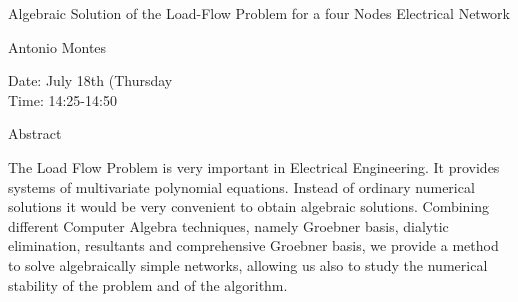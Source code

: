 \begin{center}
\LARGE
Algebraic Solution of the Load-Flow Problem for a four
                   Nodes Electrical Network
\end{center}

\begin{center}
\Large
Antonio Montes
\end{center}

\noindent
Date:  July 18th (Thursday\\
Time:  14:25-14:50\\

\begin{center}
\large
Abstract
\end{center}

The Load Flow Problem is very important in Electrical Engineering. It provides systems of
multivariate polynomial equations. Instead of ordinary numerical solutions it would be very
convenient to obtain algebraic solutions. Combining different Computer Algebra techniques,
namely Groebner basis, dialytic elimination, resultants and comprehensive Groebner basis, we
provide a method to solve algebraically simple networks, allowing us also to study the numerical
stability of the problem and of the algorithm. 

